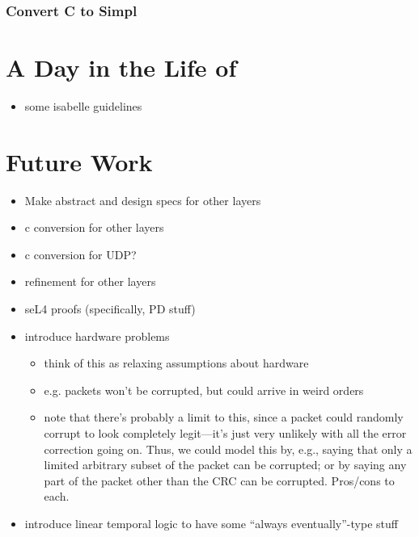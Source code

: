 \documentclass[twoside]{memoir}
\begin{document}
\subsection{Convert C to Simpl}

\chapter{A Day in the Life of}
\begin{itemize}
    \item some isabelle guidelines
\end{itemize}

\chapter{Future Work}
\begin{itemize}
    \item Make abstract and design specs for other layers
    \item c conversion for other layers
    \item c conversion for UDP?
    \item refinement for other layers
    \item seL4 proofs (specifically, PD stuff)
    \item introduce hardware problems
        \begin{itemize}
            \item think of this as relaxing assumptions about hardware
            \item e.g. packets won't be corrupted, but could arrive in weird orders
            \item note that there's probably a limit to this,
                since a packet could randomly corrupt to
                look completely legit---it's just very
                unlikely with all the error correction
                going on.
                Thus, we could model this by, e.g.,
                saying that only a limited arbitrary subset
                of the packet can be corrupted;
                or by saying any part of the packet other
                than the CRC can be corrupted.
                Pros/cons to each.
        \end{itemize}
    \item introduce linear temporal logic to have some ``always eventually''-type stuff
\end{itemize}
\end{document}
